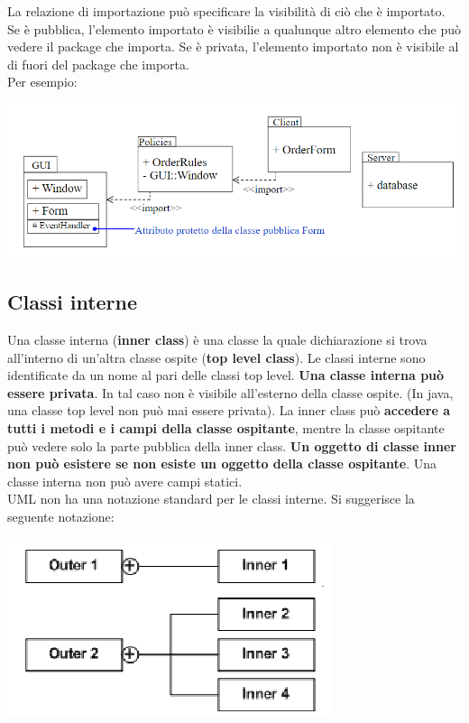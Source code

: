 \documentclass{article}
\begin{document}
	La relazione di importazione può specificare la visibilità di ciò che è importato. Se è pubblica, l'elemento importato è visibilie a qualunque altro elemento che può vedere il package che importa. Se è privata, l'elemento importato non è visibile al di fuori del package che importa.\\
	Per esempio:
	\begin{center}
		\includegraphics[scale=0.5]{assets/package_visibilita.png}
	\end{center}

	\subsection{Classi interne}
	Una classe interna (\textbf{inner class}) è una classe la quale dichiarazione si trova all'interno di un'altra classe ospite (\textbf{top level class}). Le classi interne sono identificate da un nome al pari delle classi top level. \textbf{Una classe interna può essere privata}. In tal caso non è visibile all'esterno della classe ospite. (In java, una classe top level non può mai essere privata). La inner class può \textbf{accedere a tutti i metodi e i campi della classe ospitante}, mentre la classe ospitante può vedere solo la parte pubblica della inner class. \textbf{Un oggetto di classe inner non può esistere se non esiste un oggetto della classe ospitante}. Una classe interna non può avere campi statici. \\
	UML non ha una notazione standard per le classi interne. Si suggerisce la seguente notazione:
	\begin{center}
		\includegraphics[scale=0.5]{assets/classi_interne.png}
	\end{center}
\end{document}
